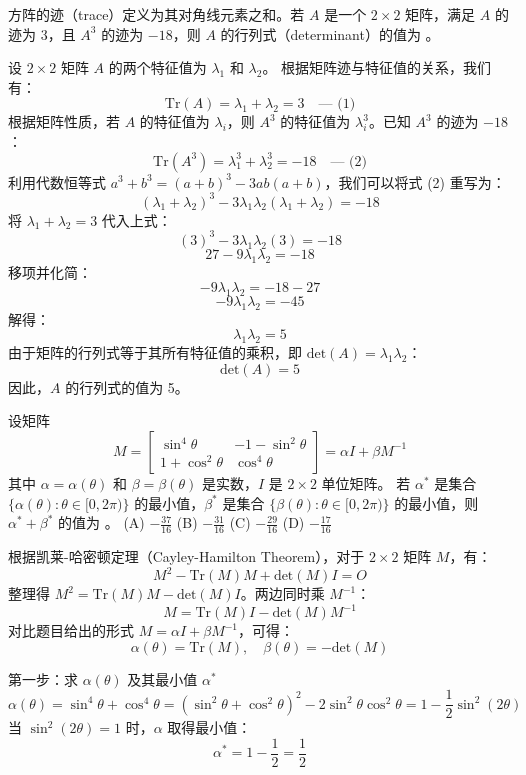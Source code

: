 \begin{questions}
    \question
方阵的迹（trace）定义为其对角线元素之和。若 $A$ 是一个 $2 \times 2$ 矩阵，满足 $A$ 的迹为 3，且 $A^3$ 的迹为 $-18$，则 $A$ 的行列式（determinant）的值为 \underline{\quad\quad}。

\begin{solution}
设 $2 \times 2$ 矩阵 $A$ 的两个特征值为 $\lambda_1$ 和 $\lambda_2$。
根据矩阵迹与特征值的关系，我们有：
\[
\text{Tr}(A) = \lambda_1 + \lambda_2 = 3 \quad \text{--- (1)}
\]
根据矩阵性质，若 $A$ 的特征值为 $\lambda_i$，则 $A^3$ 的特征值为 $\lambda_i^3$。已知 $A^3$ 的迹为 $-18$：
\[
\text{Tr}(A^3) = \lambda_1^3 + \lambda_2^3 = -18 \quad \text{--- (2)}
\]
利用代数恒等式 $a^3 + b^3 = (a + b)^3 - 3ab(a + b)$，我们可以将式 (2) 重写为：
\[
(\lambda_1 + \lambda_2)^3 - 3\lambda_1\lambda_2(\lambda_1 + \lambda_2) = -18
\]
将 $\lambda_1 + \lambda_2 = 3$ 代入上式：
\[
(3)^3 - 3\lambda_1\lambda_2(3) = -18
\]
\[
27 - 9\lambda_1\lambda_2 = -18
\]
移项并化简：
\[
-9\lambda_1\lambda_2 = -18 - 27
\]
\[
-9\lambda_1\lambda_2 = -45
\]
解得：
\[
\lambda_1\lambda_2 = 5
\]
由于矩阵的行列式等于其所有特征值的乘积，即 $\text{det}(A) = \lambda_1\lambda_2$：
\[
\text{det}(A) = 5
\]
因此，$A$ 的行列式的值为 5。
\end{solution}

\question
设矩阵
\[
M = \begin{bmatrix} \sin^4 \theta & -1 - \sin^2 \theta \\ 1 + \cos^2 \theta & \cos^4 \theta \end{bmatrix} = \alpha I + \beta M^{-1}
\]
其中 $\alpha = \alpha(\theta)$ 和 $\beta = \beta(\theta)$ 是实数，$I$ 是 $2 \times 2$ 单位矩阵。
若 $\alpha^*$ 是集合 $\{\alpha(\theta) : \theta \in [0, 2\pi)\}$ 的最小值，$\beta^*$ 是集合 $\{\beta(\theta) : \theta \in [0, 2\pi)\}$ 的最小值，则 $\alpha^* + \beta^*$ 的值为 \underline{\quad\quad}。
(A) $-\frac{37}{16}$ \quad (B) $-\frac{31}{16}$ \quad (C) $-\frac{29}{16}$ \quad (D) $-\frac{17}{16}$

\begin{solution}
根据凯莱-哈密顿定理（Cayley-Hamilton Theorem），对于 $2 \times 2$ 矩阵 $M$，有：
\[
M^2 - \text{Tr}(M)M + \text{det}(M)I = O
\]
整理得 $M^2 = \text{Tr}(M)M - \text{det}(M)I$。两边同时乘 $M^{-1}$：
\[
M = \text{Tr}(M)I - \text{det}(M)M^{-1}
\]
对比题目给出的形式 $M = \alpha I + \beta M^{-1}$，可得：
\[
\alpha(\theta) = \text{Tr}(M), \quad \beta(\theta) = -\text{det}(M)
\]

第一步：求 $\alpha(\theta)$ 及其最小值 $\alpha^*$
\[
\alpha(\theta) = \sin^4 \theta + \cos^4 \theta = (\sin^2 \theta + \cos^2 \theta)^2 - 2 \sin^2 \theta \cos^2 \theta = 1 - \frac{1}{2} \sin^2(2\theta)
\]
当 $\sin^2(2\theta) = 1$ 时，$\alpha$ 取得最小值：
\[
\alpha^* = 1 - \frac{1}{2} = \frac{1}{2}
\]


\end{solution}
\end{questions}

